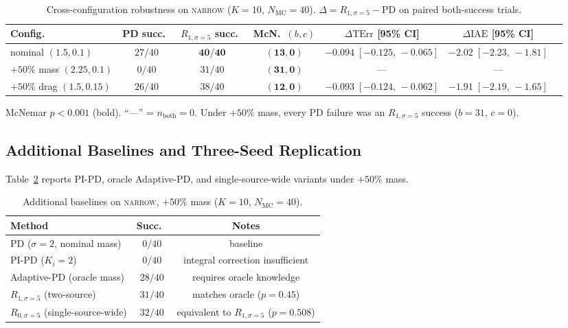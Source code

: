 \documentclass[11pt,a4paper]{article}
\newcommand{\Nm}{N_{\mathrm{MC}}}
\newcommand{\TErr}{\mathrm{TErr}}
\newcommand{\IAE}{\mathrm{IAE}}
\begin{document}
\begin{table}[h]
\centering
\caption{Cross-configuration robustness on \textsc{narrow}
($K = 10$, $\Nm = 40$). $\Delta = R_{1,\sigma=5} - \text{PD}$ on
paired both-success trials.}\label{tab:s1-crossconfig}
\begin{tabular}{lcccccc}
\toprule
Config.\ & PD succ.\ & $R_{1,\sigma=5}$ succ.\ & McN.\ $(b,c)$ &
$\Delta\TErr$ [95\% CI] & $\Delta\IAE$ [95\% CI] \\
\midrule
nominal $(1.5, 0.1)$ &
$27/40$ & $\mathbf{40/40}$ & $\mathbf{(13,0)}$ &
$\mathbf{-0.094\;[-0.125,\,-0.065]}$ &
$\mathbf{-2.02\;[-2.23,\,-1.81]}$ \\
$+50\%$ mass $(2.25, 0.1)$ &
$0/40$ & $31/40$ & $\mathbf{(31,0)}$ & --- & --- \\
$+50\%$ drag $(1.5, 0.15)$ &
$26/40$ & $38/40$ & $\mathbf{(12,0)}$ &
$\mathbf{-0.093\;[-0.124,\,-0.062]}$ &
$\mathbf{-1.91\;[-2.19,\,-1.65]}$ \\
\bottomrule
\end{tabular}
\par\smallskip
McNemar $p < 0.001$ (bold). ``---'' = $n_{\mathrm{both}} = 0$.
Under $+50\%$ mass, every PD failure was an $R_{1,\sigma=5}$ success
($b = 31$, $c = 0$).
\end{table}

\subsection{Additional Baselines and Three-Seed Replication}

Table~\ref{tab:s1-baselines} reports PI-PD, oracle Adaptive-PD, and
single-source-wide variants under $+50\%$ mass.

\begin{table}[h]
\centering
\caption{Additional baselines on \textsc{narrow}, $+50\%$ mass
($K = 10$, $\Nm = 40$).}\label{tab:s1-baselines}
\begin{tabular}{lcc}
\toprule
Method & Succ.\ & Notes \\
\midrule
PD ($\sigma = 2$, nominal mass) & $0/40$ & baseline \\
PI-PD ($K_i = 2$) & $0/40$ & integral correction insufficient \\
Adaptive-PD (oracle mass) & $28/40$ & requires oracle knowledge \\
$R_{1,\sigma=5}$ (two-source) & $31/40$ & matches oracle ($p = 0.45$) \\
$R_{0,\sigma=5}$ (single-source-wide) & $32/40$ & equivalent to $R_{1,\sigma=5}$ ($p = 0.508$) \\
\bottomrule
\end{tabular}
\end{table}
\end{document}
